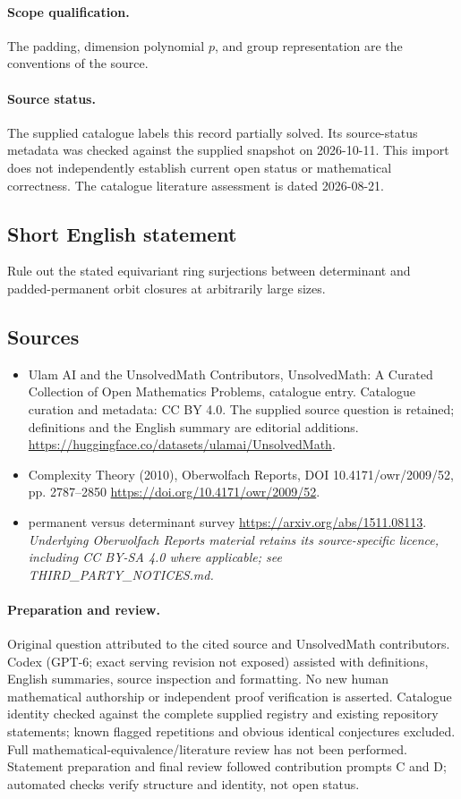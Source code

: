 \documentclass[11pt]{article}
\begin{document}
\paragraph{Scope qualification.}
The padding, dimension polynomial $p$, and group representation are the conventions of the source.
\paragraph{Source status.}
The supplied catalogue labels this record partially solved. Its source-status metadata was checked against the supplied snapshot on 2026-10-11. This import does not independently establish current open status or mathematical correctness. The catalogue literature assessment is dated 2026-08-21.
\subsection{Short English statement}
Rule out the stated equivariant ring surjections between determinant and padded-permanent orbit closures at arbitrarily large sizes.
\subsection{Sources}
\begin{itemize}
\item[S1] Ulam AI and the UnsolvedMath Contributors, UnsolvedMath: A Curated Collection of Open Mathematics Problems, catalogue entry. Catalogue curation and metadata: CC BY 4.0. The supplied source question is retained; definitions and the English summary are editorial additions.
\url{https://huggingface.co/datasets/ulamai/UnsolvedMath}.
\item[S2] Complexity Theory (2010), Oberwolfach Reports, DOI 10.4171/owr/2009/52, pp. 2787--2850
\url{https://doi.org/10.4171/owr/2009/52}.
\item[S3] permanent versus determinant survey
\url{https://arxiv.org/abs/1511.08113}.
\textit{Underlying Oberwolfach Reports material retains its source-specific licence, including CC BY-SA 4.0 where applicable; see THIRD\_PARTY\_NOTICES.md.}
\end{itemize}
\paragraph{Preparation and review.}
Original question attributed to the cited source and UnsolvedMath contributors. Codex (GPT-6; exact serving revision not exposed) assisted with definitions, English summaries, source inspection and formatting. No new human mathematical authorship or independent proof verification is asserted. Catalogue identity checked against the complete supplied registry and existing repository statements; known flagged repetitions and obvious identical conjectures excluded. Full mathematical-equivalence/literature review has not been performed. Statement preparation and final review followed contribution prompts C and D; automated checks verify structure and identity, not open status.
\label{end:statement}
\end{document}
